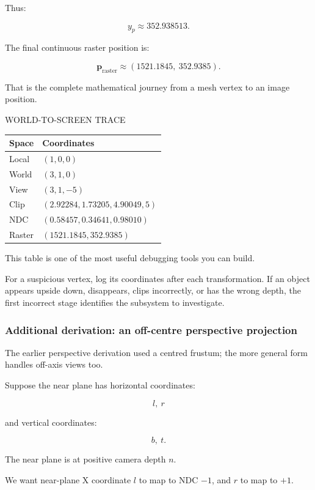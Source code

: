 Thus:

\[
 \boxed{y_p\approx352.938513}.
\]

The final continuous raster position is:

\[
 \boxed{ \mathbf p_{\mathrm{raster}} \approx (1521.1845,\ 352.9385) }.
\]

That is the complete mathematical journey from a mesh vertex to an image position.

WORLD-TO-SCREEN TRACE

{\def\LTcaptype{none} %
\begin{longtable}[]{@{}ll@{}}
\toprule\noalign{}
Space & Coordinates \\
\midrule\noalign{}
\endhead
\bottomrule\noalign{}
\endlastfoot
Local & \((1,0,0)\) \\
World & \((3,1,0)\) \\
View & \((3,1,-5)\) \\
Clip & \((2.92284,1.73205,4.90049,5)\) \\
NDC & \((0.58457,0.34641,0.98010)\) \\
Raster & \((1521.1845,352.9385)\) \\
\end{longtable}
}

This table is one of the most useful debugging tools you can build.

For a suspicious vertex, log its coordinates after each transformation. If an object appears upside down, disappears, clips incorrectly, or has the wrong depth, the first incorrect stage identifies the subsystem to investigate.

\subsubsection{Additional derivation: an off-centre perspective projection}\label{additional-derivation-an-off-centre-perspective-projection}

The earlier perspective derivation used a centred frustum; the more general form handles off-axis views too.

Suppose the near plane has horizontal coordinates:

\[
 l,\ r
\]

and vertical coordinates:

\[
 b,\ t.
\]

The near plane is at positive camera depth \(n\).

We want near-plane X coordinate \(l\) to map to NDC \(-1\), and \(r\) to map to \(+1\).

